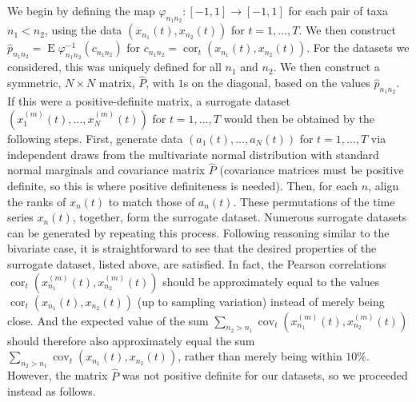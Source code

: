 \documentclass[letterpaper,11pt]{article}
\newcommand{\E}{\operatorname{E}}
\newcommand{\cor}{\operatorname{cor}}
\newcommand{\cov}{\operatorname{cov}}
\begin{document}
We begin by defining the map $\varphi_{n_1 n_2}:[-1,1]\rightarrow[-1,1]$
for each pair of taxa $n_1<n_2$, using the data $(x_{n_1}(t),x_{n_2}(t))$ for $t=1,\ldots,T$.
We then construct $\hat{p}_{n_1 n_2} = \E\varphi_{n_1 n_2}^{-1}(c_{n_1 n_2})$ for 
$c_{n_1 n_2} = \cor_t(x_{n_1}(t),x_{n_2}(t))$.
For the datasets we considered, this was uniquely defined for all $n_1$ and $n_2$.
We then construct a symmetric, $N \times N$ matrix, $\hat{P}$, with $1$s on the diagonal, based on the 
values $\hat{p}_{n_1 n_2}$. If this were a positive-definite matrix, a surrogate 
dataset $(x_1^{(m)}(t),\ldots,x_N^{(m)}(t))$ for $t=1,\ldots,T$ would 
then be obtained by the following steps. First, generate data 
$(a_1(t),\ldots,a_N(t))$ for $t=1,\ldots,T$ via independent draws from the multivariate normal
distribution with standard normal marginals and covariance matrix $\hat{P}$
(covariance matrices must be positive definite, so this is where positive definiteness is needed).
Then, for each $n$, align the ranks of $x_n(t)$ to match those of $a_n(t)$.
These permutations of the time series $x_n(t)$, together, form the surrogate dataset.
Numerous surrogate datasets can be generated by repeating this process.
Following reasoning similar to the bivariate case, it is straightforward
to see that the desired properties of the surrogate dataset, listed above, are
satisfied. In fact, the Pearson correlations 
$\cor_t(x_{n_1}^{(m)}(t),x_{n_2}^{(m)}(t))$ should be approximately equal
to the values $\cor_t(x_{n_1}(t),x_{n_2}(t))$ (up to sampling variation) 
instead of merely being close. And  
the expected value of the sum $\sum_{n_2>n_1} \cov_t(x_{n_1}^{(m)}(t),x_{n_2}^{(m)}(t))$
should therefore also approximately equal the sum $\sum_{n_2>n_1} \cov_t(x_{n_1}(t),x_{n_2}(t))$,
rather than merely being within $10\%$. However, the matrix $\hat{P}$ was not 
positive definite for our datasets, 
so we proceeded instead as follows. 
\end{document}
